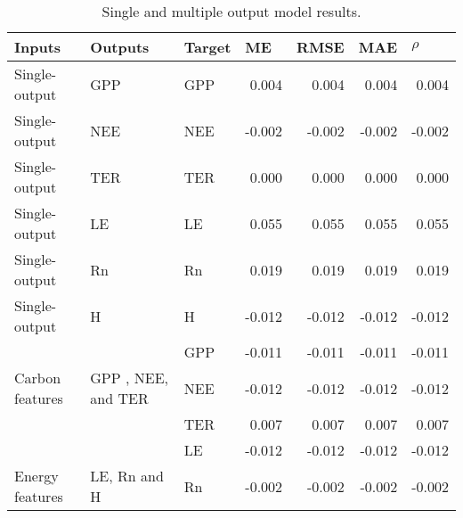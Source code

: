 \begin{table}[htbp]

\caption{Single and multiple output model results.}

\begin{center}

  \begin{tabular}{|l|l|l|r|r|r|r|}

    \hline

    Inputs & Outputs & Target & \multicolumn{1}{l|}{ME} & \multicolumn{1}{l|}{RMSE} & \multicolumn{1}{l|}{MAE} & \multicolumn{1}{l|}{$\rho$} \\ \hline

    Single-output & GPP & GPP & 0.004 & 0.004 & 0.004 & 0.004 \\ \hline

    Single-output & NEE  & NEE & -0.002 & -0.002 & -0.002 & -0.002 \\ \hline

    Single-output & TER  & TER & 0.000 & 0.000 & 0.000 & 0.000 \\ \hline

    Single-output & LE  & LE & 0.055 & 0.055 & 0.055 & 0.055 \\ \hline

    Single-output & Rn  & Rn & 0.019 & 0.019 & 0.019 & 0.019 \\ \hline

    Single-output & H   & H & -0.012 & -0.012 & -0.012 & -0.012 \\ \hline

    \multicolumn{ 1}{|c|}{} & \multicolumn{ 1}{c|}{} & GPP & -0.011 & -0.011 & -0.011 & -0.011 \\ \cline{ 3- 6}

    \multicolumn{ 1}{|l|}{Carbon features} & \multicolumn{ 1}{l|}{GPP , NEE, and TER} & NEE & -0.012 & -0.012 & -0.012 & -0.012 \\ \cline{ 3- 6}

    \multicolumn{ 1}{|l|}{} & \multicolumn{ 1}{l|}{} & TER & 0.007 & 0.007 & 0.007 & 0.007 \\ \hline

    \multicolumn{ 1}{|c|}{} & \multicolumn{ 1}{c|}{} & LE & -0.012 & -0.012 & -0.012 & -0.012 \\ \cline{ 3- 6}

    \multicolumn{ 1}{|l|}{Energy features} & \multicolumn{ 1}{l|}{LE, Rn and H} &  Rn & -0.002 & -0.002 & -0.002 & -0.002 \\ \cline{ 3- 6}


\end{tabular}
\end{center}
\end{table}
